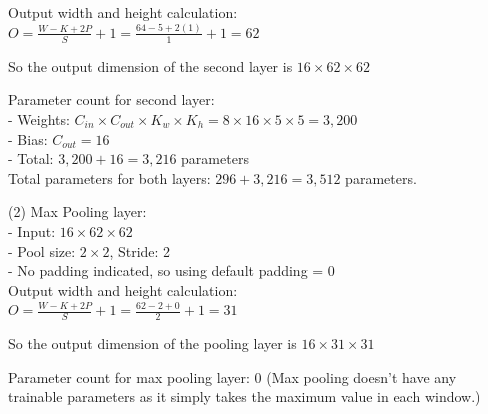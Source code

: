 Output width and height calculation:\\
$O = \frac{W - K + 2P}{S} + 1 = \frac{64 - 5 + 2(1)}{1} + 1 = 62$

So the output dimension of the second layer is $16 \times 62 \times 62$

Parameter count for second layer:\\
- Weights: $C_{in} \times C_{out} \times K_w \times K_h = 8 \times 16 \times 5 \times 5 = 3,200$\\
- Bias: $C_{out} = 16$\\
- Total: $3,200 + 16 = 3,216$ parameters\\

Total parameters for both layers: $296 + 3,216 = 3,512$ parameters.

(2) Max Pooling layer:\\
- Input: $16 \times 62 \times 62$\\
- Pool size: $2 \times 2$, Stride: 2\\
- No padding indicated, so using default padding = 0\\

Output width and height calculation:\\
$O = \frac{W - K + 2P}{S} + 1 = \frac{62 - 2 + 0}{2} + 1 = 31$

So the output dimension of the pooling layer is $16 \times 31 \times 31$

Parameter count for max pooling layer: 0
(Max pooling doesn't have any trainable parameters as it simply takes the maximum value in each window.)

\newpage
